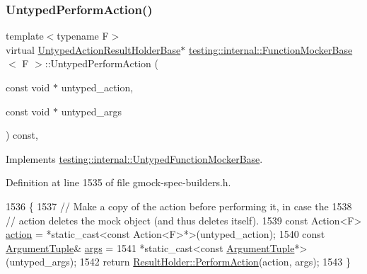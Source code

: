 \subsubsection{\texorpdfstring{Untyped\+Perform\+Action()}{UntypedPerformAction()}}
{\footnotesize\ttfamily template$<$typename F$>$ \\
virtual \hyperlink{classtesting_1_1internal_1_1UntypedActionResultHolderBase}{Untyped\+Action\+Result\+Holder\+Base}$\ast$ \hyperlink{classtesting_1_1internal_1_1FunctionMockerBase}{testing\+::internal\+::\+Function\+Mocker\+Base}$<$ F $>$\+::Untyped\+Perform\+Action (\begin{DoxyParamCaption}\item[{const void $\ast$}]{untyped\+\_\+action,  }\item[{const void $\ast$}]{untyped\+\_\+args }\end{DoxyParamCaption}) const\hspace{0.3cm}{\ttfamily [inline]}, {\ttfamily [virtual]}}



Implements \hyperlink{classtesting_1_1internal_1_1UntypedFunctionMockerBase_ada5a72303863d0aa655b66338b8efea5}{testing\+::internal\+::\+Untyped\+Function\+Mocker\+Base}.



Definition at line 1535 of file gmock-\/spec-\/builders.\+h.


\begin{DoxyCode}
1536                                                                   \{
1537     \textcolor{comment}{// Make a copy of the action before performing it, in case the}
1538     \textcolor{comment}{// action deletes the mock object (and thus deletes itself).}
1539     \textcolor{keyword}{const} Action<F> \hyperlink{namespaceupload_a675d13c979f1c720866d22ed1736f580}{action} = *\textcolor{keyword}{static\_cast<}\textcolor{keyword}{const }Action<F>*\textcolor{keyword}{>}(untyped\_action);
1540     \textcolor{keyword}{const} \hyperlink{classtesting_1_1internal_1_1FunctionMockerBase_a336432a07e544af4ffb8103603471ca3}{ArgumentTuple}& \hyperlink{namespacegenerate__debs_a75f9143e38df82d83b2e8a6f99cae02c}{args} =
1541         *\textcolor{keyword}{static\_cast<}\textcolor{keyword}{const }\hyperlink{classtesting_1_1internal_1_1FunctionMockerBase_a336432a07e544af4ffb8103603471ca3}{ArgumentTuple}*\textcolor{keyword}{>}(untyped\_args);
1542     \textcolor{keywordflow}{return} \hyperlink{classtesting_1_1internal_1_1ActionResultHolder_a9e10aff754b5caf69b14964f3c9c79ec}{ResultHolder::PerformAction}(action, args);
1543   \}
\end{DoxyCode}
\mbox{\label{classtesting_1_1internal_1_1FunctionMockerBase_aed1c6248ba1b50437ee3a5f72c5f7bf3}} 
